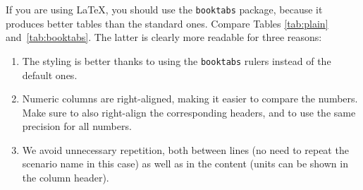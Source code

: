 If you are using \LaTeX, you should use the {\tt booktabs} package, because it produces better tables than the standard ones. Compare Tables \ref{tab:plain} and~\ref{tab:booktabs}. The latter is clearly more readable for three reasons:

\begin{enumerate}
    \item The styling is better thanks to using the {\tt booktabs} rulers instead of the default ones.
    \item Numeric columns are right-aligned, making it easier to compare the numbers. Make sure to also right-align the corresponding headers, and to use the same precision for all numbers.
    \item We avoid unnecessary repetition, both between lines (no need to repeat the scenario name in this case) as well as in the content (units can be shown in the column header).
\end{enumerate}

\fi